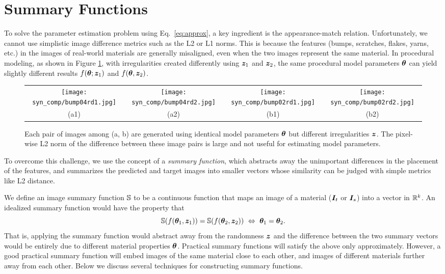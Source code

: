 \section{Summary Functions}
\label{sec:summary_func}

To solve the parameter estimation problem using Eq.~\eqref{eq:approx}, a key ingredient is the appearance-match relation.
Unfortunately, we cannot use simplistic image difference metrics such as the L2 or L1 norms.
This is because the features (bumps, scratches, flakes, yarns, etc.) in the images of real-world materials are generally misaligned, even when the two images represent the same material.
In procedural modeling, as shown in Figure \ref{fig:syn1}, with irregularities created differently using $\bm{z}_1$ and $\bm{z}_2$, the same procedural model parameters $\bm{\theta}$ can yield slightly different results $f(\bm{\theta}; \bm{z}_1)$ and $f(\bm{\theta}, \bm{z}_2)$.

\begin{figure}[t]
	\addtolength{\tabcolsep}{-5pt}
	\begin{tabular}{cccc}
		\texttt{[image: syn\_comp/bump04rd1.jpg]} &
		\texttt{[image: syn\_comp/bump04rd2.jpg]} &
		\texttt{[image: syn\_comp/bump02rd1.jpg]} &
		\texttt{[image: syn\_comp/bump02rd2.jpg]} \\
		(a1) & (a2) & (b1) & (b2)
	\end{tabular}
	\captionsetup{labelfont=bf,textfont=it}
	\caption{\label{fig:syn1}
		Each pair of images among (a, b) are generated using identical model parameters $\bm{\theta}$ but different irregularities $\bm{z}$. The pixel-wise L2 norm of the difference between these image pairs is large and not useful for estimating model parameters.
	}
\end{figure}

To overcome this challenge, we use the concept of a \emph{summary function}, which abstracts away the unimportant differences in the placement of the features, and summarizes the predicted and target images into smaller vectors whose similarity can be judged with simple metrics like L2 distance.

We define an image summary function $\mathbb{S}$ to be a continuous function that maps an image of a material ($\bm{I}_t$ or $\bm{I}_s$) into a vector in $\mathbb{R}^k$. An idealized summary function would have the property that
%
\begin{equation}
	\mathbb{S}(f(\bm{\theta}_1, \bm{z}_1)) = \mathbb{S}(f(\bm{\theta}_2, \bm{z}_2)) \ \Leftrightarrow \ \bm{\theta}_1 = \bm{\theta}_2.
\end{equation}
%
That is, applying the summary function would %
abstract away from the randomness $\bm{z}$ and the difference between the two summary vectors would be entirely due to different material properties $\bm{\theta}$. Practical summary functions will satisfy the above only approximately. However, a good practical summary function will embed images of the same material close to each other, and images of different materials further away from each other. Below we discuss several techniques for constructing summary functions.

